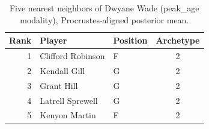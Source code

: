 \begin{table}[htbp]
  \centering\small
  \begin{tabular}{rllc}
    \toprule
    Rank & Player & Position & Archetype \\
    \midrule
    1 & Clifford Robinson & F & 2 \\
    2 & Kendall Gill & G & 2 \\
    3 & Grant Hill & G & 2 \\
    4 & Latrell Sprewell & G & 2 \\
    5 & Kenyon Martin & F & 2 \\
    \bottomrule
  \end{tabular}
  \caption{Five nearest neighbors of Dwyane Wade (peak_age modality), Procrustes-aligned posterior mean.}
  \label{tab:Dwyane_Wade_neighbors_peak_age}
\end{table}

